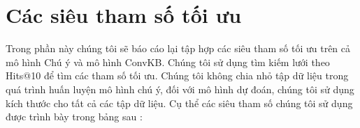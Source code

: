 \appendix 

\chapter{Các siêu tham số tối ưu}
\label{Appendix1}

Trong phần này chúng tôi sẽ báo cáo lại tập hợp các siêu tham số tối ưu trên cả mô hình Chú ý và mô hình ConvKB.
Chúng tôi sử dụng tìm kiếm lưới theo Hits@10 để tìm các tham số tối ưu. Chúng tôi không chia nhỏ tập dữ liệu trong quá trình huấn luyện mô hình chú ý,
đối với mô hình dự đoán, chúng tôi sử dụng kích thước cho tất cả các tập dữ liệu. Cụ thể các siêu tham số chúng tôi sử dụng được trình bày trong bảng sau :

\begin{table}[htbp]
	\begin{center}
\end{center}
\end{table}